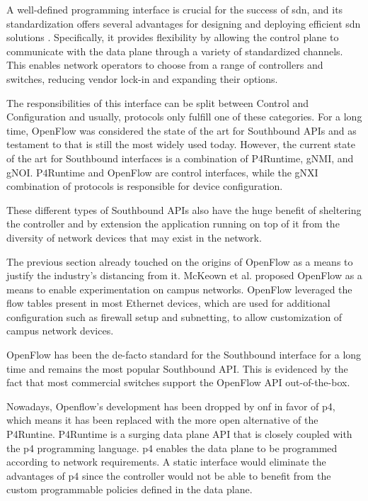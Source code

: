 A well-defined programming interface is crucial for the success of \gls{sdn}, and its standardization offers several advantages for designing and deploying efficient \gls{sdn} solutions\cite{latif_comprehensive_2020} \cite{kreutz_software-defined_2015}. Specifically, it provides flexibility by allowing the control plane to communicate with the data plane through a variety of standardized channels. This enables network operators to choose from a range of controllers and switches, reducing vendor lock-in and expanding their options.

The responsibilities of this interface can be split between Control and Configuration\cite{peterson_software-defined_2021} and usually, protocols only fulfill one of these categories. For a long time, OpenFlow was considered the state of the art for Southbound APIs and as testament to that is still the most widely used today\cite{latif_comprehensive_2020}. However, the current state of the art for Southbound interfaces is a combination of P4Runtime, gNMI, and gNOI. P4Runtime and OpenFlow are control interfaces, while the gNXI combination of protocols is responsible for device configuration\cite{peterson_software-defined_2021}.

These different types of Southbound APIs also have the huge benefit of sheltering the controller and by extension the application running on top of it from the diversity of network devices that may exist in the network. \cite{peterson_software-defined_2021}

The previous section already touched on the origins of OpenFlow as a means to justify the industry's distancing from it. McKeown et al. proposed OpenFlow\cite{mckeown_openflow_2008} as a means to enable experimentation on campus networks. OpenFlow leveraged the flow tables present in most Ethernet devices, which are used for additional configuration such as firewall setup and subnetting, to allow customization of campus network devices. \cite{xia_survey_2015}

OpenFlow has been the de-facto standard for the Southbound interface for a long time\cite{nunes_survey_2014} and remains the most popular Southbound API. This is evidenced by the fact that most commercial switches support the OpenFlow API out-of-the-box\cite{kreutz_software-defined_2015}.

Nowadays, Openflow's development has been dropped by \gls{onf} in favor of \gls{p4}, which means it has been replaced with the more open alternative of the P4Runtine. P4Runtime is a surging data plane API\cite{hauser_survey_2021} that is closely coupled with the \gls{p4} programming language. \gls{p4} enables the data plane to be programmed according to network requirements. A static interface would eliminate the advantages of \gls{p4} since the controller would not be able to benefit from the custom programmable policies defined in the data plane. 

